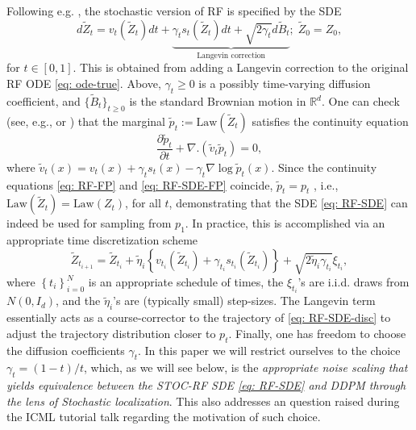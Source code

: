 \documentclass{article}
\theoremstyle{plain}
\theoremstyle{definition}
\theoremstyle{remark}
\def\bbR{\mathbb{R}}
\newcommand{\bc}[1]{\left\{{#1}\right\}}
\newcommand{\Law}{\text{Law}}
\begin{document}
Following e.g. \citet[Chapter 5]{Liu2024_FlowNotes}, the stochastic version of RF is specified by the SDE 
\begin{equation}
\label{eq: RF-SDE}
    d\tilde Z_t = v_t(\tilde Z_t)dt + \underbrace{\gamma_t s_t(\tilde Z_t)dt + \sqrt{2 \gamma_t} d \tilde B_t}_{\text{Langevin correction}}; \; \tilde Z_0 = Z_0,
\end{equation}
for $t \in [0,1]$. This is obtained from adding a Langevin correction to the original RF ODE \eqref{eq: ode-true}.
Above, $\gamma_t\geq  0$ is a possibly time-varying diffusion coefficient, and $\{\tilde B_t\}_{t\ge 0}$ is the standard Brownian motion in $\bbR^d$. %
One can check (see, e.g.,  \citet[Section 5.2]{Liu2024_FlowNotes} or \citet{song2021scorebased}) that the marginal $\tilde p_t := \Law(\tilde Z_t)$ satisfies  the continuity equation 
\begin{equation}
    \label{eq: RF-SDE-FP}
    \frac{\partial \tilde p_t}{\partial t} + \nabla. (\tilde v_t \tilde p_t) = 0,
\end{equation}
where $\tilde v_t(x) = v_t(x) + \gamma_t s_t(x) - \gamma_t \nabla \log \tilde p_t(x)$.   Since the continuity equations  \eqref{eq: RF-FP} and \eqref{eq: RF-SDE-FP} coincide, $\tilde p_t = p_t$ , i.e., $\Law(\tilde Z_t) = \Law(Z_t)$, for all $t$, demonstrating that the SDE \eqref{eq: RF-SDE} can indeed be used for sampling from $p_1$. In practice, this is accomplished via an appropriate time discretization scheme
\begin{equation}
    \label{eq: RF-SDE-disc}
    \tilde Z_{t_{i+1}} = \tilde Z_{t_i} + \tilde \eta_i \bc{v_{t_i}(\tilde Z_{t_i}) +  \gamma_{t_i} s_{t_i}(\tilde Z_{t_i})} + \sqrt{2 \tilde \eta_i \gamma_{t_i}} \xi_{t_i},
\end{equation}
where $\bc{t_i}_{i=0}^N$ is an appropriate schedule of times, the $\xi_{t_i}$'s are i.i.d. draws from $N(0, I_d)$, and the $\tilde \eta_i$'s are (typically small) step-sizes. The Langevin term essentially acts as a course-corrector to the trajectory of \eqref{eq: RF-SDE-disc} to adjust the trajectory distribution closer to $p_t$. Finally, one has freedom to choose the diffusion coefficients $\gamma_t$. In this paper we will restrict ourselves to the choice $\gamma_t = (1-t)/t$, which, as we will see below, is the \textit{appropriate noise scaling that yields equivalence between the STOC-RF SDE \eqref{eq: RF-SDE} and DDPM through the lens of Stochastic localization}. This also addresses an question raised during the ICML tutorial talk  \citet{liu2025flowing} regarding the motivation of such choice.
\end{document}
